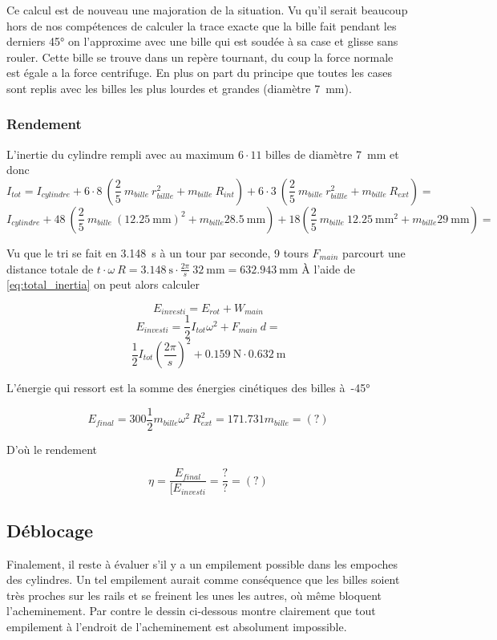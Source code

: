 Ce calcul est de nouveau une majoration de la situation. Vu qu'il serait beaucoup hors de nos compétences de calculer la trace exacte que la bille fait pendant les derniers \ang{45} on l'approxime avec une bille qui est soudée à sa case et glisse sans rouler. Cette bille se trouve dans un repère tournant, du coup la force normale est égale a la force centrifuge. En plus on part du principe que toutes les cases sont replis avec les billes les plus lourdes et grandes (diamètre \SI{7}{\milli\metre}).

\subsubsection{Rendement}
L'inertie du cylindre rempli avec au maximum $6 \cdot 11$ billes de diamètre \SI{7}{\milli\metre} et donc
    \[I_{tot} = I_{cylindre} + 6\cdot8 \ (\frac{2}{5} \ m_{bille} \ r_{billle}^{2} + m_{bille} \ R_{int}) + 6\cdot3 \ (\frac{2}{5} \ m_{bille} \ r_{billle}^{2} + m_{bille} \ R_{ext}) = \]
\begin{equation}    
    I_{cylindre} + 48\ (\frac{2}{5}\ m_{bille} \ (\SI{12.25}{\milli\metre})^{2} + m_{bille} \SI{28.5}{\milli\metre}) + 18 (\frac{2}{5} \ m_{bille} \ \SI{12.25}{\mm\squared} + m_{bille} \SI{29}{\milli\metre}) =
\label{eq:total_inertia}
\end{equation}

Vu que le tri se fait en \SI{3.148}{\s} à un tour par seconde, 9 tours $F_{main}$ parcourt une distance totale de $t \cdot \omega \ R = \SI{3.148}{\s}\cdot \frac{2\pi}{s}\ \SI{32}{\milli\metre} = \SI{632.943}{\milli\metre}$
À l'aide de \ref{eq:total_inertia} on peut alors calculer

\[E_{investi} = E_{rot} + W_{main}\]
\[E_{investi} = \frac{1}{2}I_{tot}\omega^{2} + F_{main} \ d = \]
\[\frac{1}{2}I_{tot}(\frac{2\pi}{s})^{2} + \SI{0.159}{\N}\cdot \SI{0.632}{\metre}\]
\[\]

L'énergie qui ressort est la somme des énergies cinétiques des billes à~\ang{-45}

\[E_{final} = 300 \frac{1}{2} m_{bille} \omega^{2} \ R_{ext}^{2} = 171.731 m_{bille} = (?)\]

D'où le rendement

\[\eta = \frac{E_{final}}{[E_{investi}} = \frac{?}{?} = (?)\]

\subsection{Déblocage}
Finalement, il reste à évaluer s'il y a un empilement possible dans les empoches des cylindres. Un tel empilement aurait comme conséquence que les billes soient très proches sur les rails et se freinent les unes les autres, où même bloquent l'acheminement. Par contre le dessin ci-dessous montre clairement que tout empilement à l'endroit de l'acheminement est absolument impossible.

